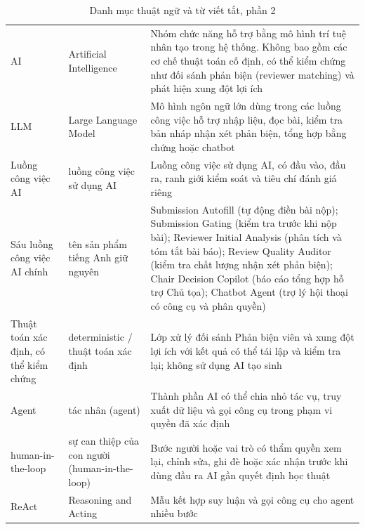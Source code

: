 \begingroup
\setlength{\tabcolsep}{2pt}
\renewcommand{\arraystretch}{1.2}
\begin{longtable}{|C{0.16\textwidth}|P{0.22\textwidth}|P{0.55\textwidth}|}  \caption{Danh mục thuật ngữ và từ viết tắt, phần 2}\\
  \hline
       &        &     \\ \hline
  AI     &     Artificial Intelligence     &     Nhóm chức năng hỗ trợ bằng mô hình trí tuệ nhân tạo trong hệ thống. Không bao gồm các cơ chế thuật toán cố định, có thể kiểm chứng như đối sánh phản biện (reviewer matching) và phát hiện xung đột lợi ích \\ \hline
  LLM     &     Large Language Model     &     Mô hình ngôn ngữ lớn dùng trong các luồng công việc hỗ trợ nhập liệu, đọc bài, kiểm tra bản nháp nhận xét phản biện, tổng hợp bằng chứng hoặc chatbot \\ \hline
  Luồng công việc AI      &      luồng công việc sử dụng AI      &      Luồng công việc sử dụng AI, có đầu vào, đầu ra, ranh giới kiểm soát và tiêu chí đánh giá riêng \\ \hline
  Sáu luồng công việc AI chính     &     tên sản phẩm tiếng Anh giữ nguyên     &     Submission Autofill (tự động điền bài nộp); Submission Gating (kiểm tra trước khi nộp bài); Reviewer Initial Analysis (phân tích và tóm tắt bài báo); Review Quality Auditor (kiểm tra chất lượng nhận xét phản biện); Chair Decision Copilot (báo cáo tổng hợp hỗ trợ Chủ tọa); Chatbot Agent (trợ lý hội thoại có công cụ và phân quyền) \\ \hline
  Thuật toán xác định, có thể kiểm chứng      &      deterministic / thuật toán xác định      &      Lớp xử lý đối sánh Phản biện viên và xung đột lợi ích với kết quả có thể tái lập và kiểm tra lại; không sử dụng AI tạo sinh \\ \hline
  Agent      &      tác nhân (agent)      &      Thành phần AI có thể chia nhỏ tác vụ, truy xuất dữ liệu và gọi công cụ trong phạm vi quyền đã xác định \\ \hline
  human-\allowbreak in-\allowbreak the-\allowbreak loop     &     sự can thiệp của con người (human-\allowbreak in-\allowbreak the-\allowbreak loop)     &     Bước người hoặc vai trò có thẩm quyền xem lại, chỉnh sửa, ghi đè hoặc xác nhận trước khi dùng đầu ra AI gần quyết định học thuật \\ \hline
  ReAct     &     Reasoning and Acting     &     Mẫu kết hợp suy luận và gọi công cụ cho agent nhiều bước \\ \hline

\end{longtable}
